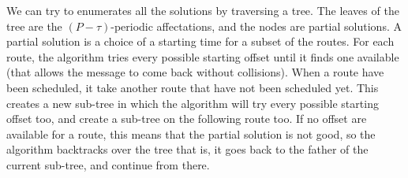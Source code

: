 \documentclass[a4paper,10pt]{article}
\newcommand{\todo}[1]{{\color{red} TODO: {#1}}}
\begin{document}
% 
% 
% 	    
      We can try to enumerates all the solutions by traversing a tree. The leaves of the tree are 
      the $(P-\tau)$-periodic affectations, and the nodes are partial solutions. A partial solution is a choice of a starting time for a subset of the routes.
      For each route, the algorithm tries every possible starting offset until it finds one available (that allows the message to come back without collisions). When a route have been scheduled, it take another route that have not been scheduled yet.
      This creates a new sub-tree in which the algorithm will try every possible starting offset too, and create a sub-tree on the following route too.
      If no offset are available for a route, this means that the partial solution is not good, so the algorithm backtracks over the tree that is,  it goes back to the father of the current sub-tree, and continue from there.
\end{document}
